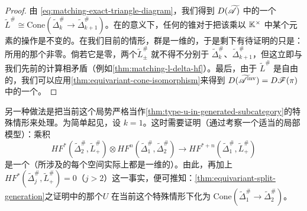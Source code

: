 \begin{proof}
由 \eqref{eq:matching-exact-triangle-diagram}，我们得到 $D(\widetilde{\mathscr{A}})$ 中的一个\trIsomorphism{}$\widetilde{L}^{\#}\cong\mathrm{Cone}(\widetilde{\Delta}^{\#}_k\to\widetilde{\Delta}^{\#}_{k+1})$。在\trIsomorphic{}的意义下，任何\trMorphism{}的锥对于把该\trMorphism{}乘以 $\mathbb{K}^{\times}$ 中某个元素的操作是不变的。在我们目前的情形，\trMorphism{}群是一维的，于是剩下有待证明的只是：所用的那个\trMorphism{}非零。倘若它是零，两个\trDirectSummand{}$\widetilde{L}^{\#}_{\pm}$ 就不得不分别\trIsomorphic{}于 $\widetilde{\Delta}^{\#}_k$、$\widetilde{\Delta}^{\#}_{k+1}$，但这立即与我们先前的\trFloerCohomology{}计算相矛盾（例如\cref{thm:matching-l-delta-hf}）。最后，由于 $\widetilde{L}^{\#}$ 是自由的，我们可以应用\cref{thm:equivariant-cone-isomorphism}来得到 $D(\widetilde{\mathscr{A}}^{\mathrm{inv}})=D\mathscr{F}(\pi)$ 中的一个\trIsomorphism。
\end{proof}
\begin{remark}\label{thm:matching-alternative-approach}
另一种做法是把当前这个局势严格当作\cref{thm:type-u-in-generated-subcategory}的特殊情形来处理。为简单起见，设 $k=1$。这时需要证明（通过考察一个适当的局部模型）：乘积
\begin{equation*}
HF^{*}(\widetilde{\Delta}^{\#}_2,\widetilde{L}^{\#}_{+})\otimes HF^{n}(\widetilde{\Delta}^{\#}_1,\widetilde{\Delta}^{\#}_2)
\longrightarrow HF^{*+n}(\widetilde{\Delta}^{\#}_1,\widetilde{L}^{\#}_{+})
\end{equation*}
是一个\trIsomorphism（所涉及的每个空间实际上都是一维的）。由此，再加上 $HF^{*}(\widetilde{\Delta}^{\#}_j,\widetilde{L}^{\#}_{+})=0$（$j>2$）这一事实，便可推知：\cref{thm:equivariant-split-generation}之证明中的那个\trObject{}$U$ 在当前这个特殊情形下化为 $\mathrm{Cone}(\widetilde{\Delta}^{\#}_1\to\widetilde{\Delta}^{\#}_2)$。
\end{remark}
